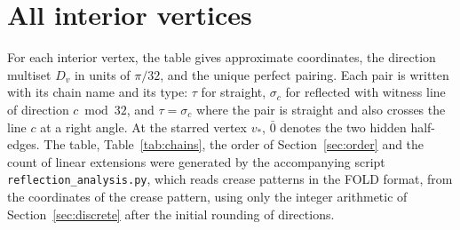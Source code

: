 \documentclass[11pt]{article}
\theoremstyle{definition}
\theoremstyle{remark}
\newcommand{\vstar}{v_\ast}
\begin{document}
\appendix
\section{All interior vertices}\label{app:table}

For each interior vertex, the table gives approximate coordinates, the direction multiset $D_v$ in units of $\pi/32$, and the unique perfect pairing. Each pair is written with its chain name and its type: $\tau$ for straight, $\sigma_c$ for reflected with witness line of direction $c\bmod 32$, and $\tau{=}\sigma_c$ where the pair is straight and also crosses the line $c$ at a right angle. At the starred vertex $\vstar$, $\bar 0$ denotes the two hidden half-edges. The table, Table~\ref{tab:chains}, the order of Section~\ref{sec:order} and the count of linear extensions were generated by the accompanying script \texttt{reflection\_analysis.py}, which reads crease patterns in the FOLD format, from the coordinates of the crease pattern, using only the integer arithmetic of Section~\ref{sec:discrete} after the initial rounding of directions.
\end{document}
